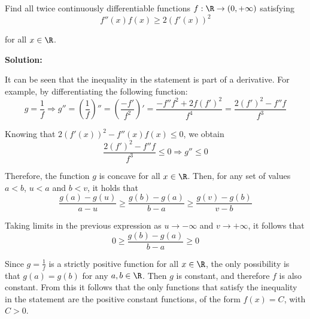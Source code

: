 \documentclass[../../main.tex]{subfiles}
\begin{document}
  \begin{shaded}
    Find all twice continuously differentiable functions $f: \R \to (0, + \infty)$ satisfying
    $$
    f''(x) f(x) \geq 2 (f'(x))^2
    $$

    for all $x \in \R$.
  \end{shaded}

  \textbf{Solution:}

  It can be seen that the inequality in the statement is part of a derivative. For example, by differentiating the following function:
  $$
  g = \frac{1}{f} \Longrightarrow g'' = \left(\frac{1}{f}\right)'' = \left(\frac{-f'}{f^2}\right)' = \frac{-f'' f^2 + 2 f (f')^2}{f^4} = \frac{2 (f')^2 -f'' f}{f^3}
  $$

  Knowing that $ 2 (f'(x))^2 - f''(x) f(x) \leq 0$, we obtain
  $$
  \frac{2 (f')^2 -f'' f}{f^3} \leq 0 \Longrightarrow g'' \leq 0
  $$

  Therefore, the function $g$ is concave for all $x \in \R$. Then, for any set of values $a < b$, $u < a$ and $b < v$, it holds that
  $$
  \frac{g(a) - g(u)}{a - u} \geq \frac{g(b) - g(a)}{b - a} \geq \frac{g(v) - g(b)}{v - b}
  $$

  Taking limits in the previous expression as $u \to - \infty$ and $v \to + \infty$, it follows that
  $$
  0 \geq \frac{g(b) - g(a)}{b - a} \geq 0
  $$

  Since $g = \displaystyle\frac{1}{f}$ is a strictly positive function for all $x \in \R$, the only possibility is that $g(a) = g(b)$ for any $a, b \in \R$. Then $g$ is constant, and therefore $f$ is also constant. From this it follows that the only functions that satisfy the inequality in the statement are the positive constant functions, of the form $f(x) = C$, with $C > 0$.
\end{document}
